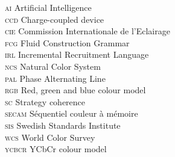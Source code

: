 \label{abbreviations}

\setlength{\parindent}{0pt}

\textsc{ai} Artificial Intelligence\\
\textsc{ccd} Charge-coupled device\\
\textsc{cie} Commission Internationale de l'Eclairage\\
\textsc{fcg} Fluid Construction Grammar\\
\textsc{irl} Incremental Recruitment Language\\
\textsc{ncs} Natural Color System\\
\textsc{pal} Phase Alternating Line\\
\textsc{rgb} Red, green and blue colour model\\
\textsc{sc} Strategy coherence\\
\textsc{secam} Séquentiel couleur à mémoire\\
\textsc{sis} Swedish Standards Institute\\
\textsc{wcs} World Color Survey\\
\textsc{ycbcr} YCbCr colour model\\

\setlength{\parindent}{10pt}

